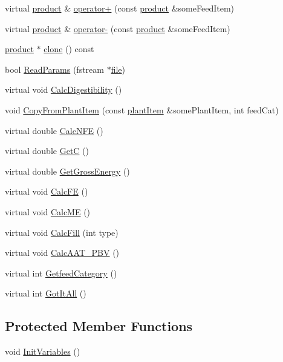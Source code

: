 \begin{DoxyCompactItemize}
\item 
virtual \hyperlink{classproduct}{product} \& \hyperlink{classfeed_item_ab2bb86c4db1650dac95b927ce96f45c5}{operator+} (const \hyperlink{classproduct}{product} \&someFeedItem)
\item 
virtual \hyperlink{classproduct}{product} \& \hyperlink{classfeed_item_aa3d93bb82d9d41b25214375a88ee36f8}{operator-\/} (const \hyperlink{classproduct}{product} \&someFeedItem)
\item 
\hyperlink{classproduct}{product} $\ast$ \hyperlink{classfeed_item_a7e3003ebb344d52fea31448657666253}{clone} () const 
\item 
bool \hyperlink{classfeed_item_ae5e9716346904aac836c5c3c2f49de3c}{ReadParams} (fstream $\ast$\hyperlink{classbase_a3af52ee9891719d09b8b19b42450b6f6}{file})
\item 
virtual void \hyperlink{classfeed_item_a86cf44036c42020b4760d1e9b79f2bd1}{CalcDigestibility} ()
\item 
void \hyperlink{classfeed_item_aaed43966abf8f097fc6245e97ecb2726}{CopyFromPlantItem} (const \hyperlink{classplant_item}{plantItem} \&somePlantItem, int feedCat)
\item 
virtual double \hyperlink{classfeed_item_a3ecdcc476b661f9bc22864de7ee4da56}{CalcNFE} ()
\item 
virtual double \hyperlink{classfeed_item_a6b6490080cfae6efeaaeb7d4f92f9d05}{GetC} ()
\item 
virtual double \hyperlink{classfeed_item_af2e734ffbfb0150e8835f00828d100c4}{GetGrossEnergy} ()
\item 
virtual void \hyperlink{classfeed_item_a638c45c2e59d81f7e21cd92b511db906}{CalcFE} ()
\item 
virtual void \hyperlink{classfeed_item_a65b1eff694520848d90bcecad5f1c317}{CalcME} ()
\item 
virtual void \hyperlink{classfeed_item_a1df09eb5f68546dac21b1088cee22cea}{CalcFill} (int type)
\item 
virtual void \hyperlink{classfeed_item_ab684796df8e02d6ba66bbf0c39328dc5}{CalcAAT\_\-PBV} ()
\item 
virtual int \hyperlink{classfeed_item_a6f91099ccf3f6eb6d80a77d2d7741ae4}{GetfeedCategory} ()
\item 
virtual int \hyperlink{classfeed_item_ad32ea468e670ec4226661e1983116495}{GotItAll} ()
\end{DoxyCompactItemize}
\subsection*{Protected Member Functions}
\begin{DoxyCompactItemize}
\item 
void \hyperlink{classfeed_item_ae08d4c420b75b14c595dab525f96dd9d}{InitVariables} ()
\end{DoxyCompactItemize}
